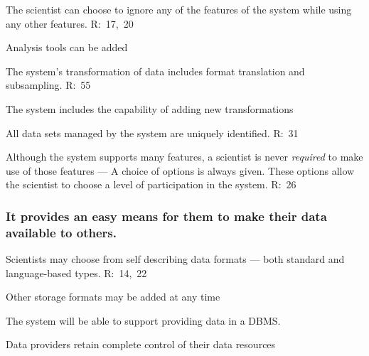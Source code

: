 \begin{list}{}{}
\begin{list}{.}{}
\item The scientist can choose to ignore any of the features of the system
       while using any other features.
       R:~17,~20

\item Analysis tools can be added

\begin{list}{--}{}

     \item The system's transformation of data includes format translation
           and subsampling. 
           R:~55

     \item The system includes the capability of adding new
           transformations

\end{list}

\item All data sets managed by the system are uniquely identified.
       R:~31

\item Although the system supports many features, a scientist is never
{\em required\/} to make use of those features --- A choice of options is
always given. These options allow the scientist to choose a level of
participation in the system.  R:~26
      
\end{list}

\subsubsection {It provides an easy means for them to make their data 
available to others.}

\begin{list}{.}{}

\item Scientists may choose from self describing data formats --- both
       standard and language-based types. 
       R:~14,~22

\item Other storage formats may be added at any time

\item The system will be able to support providing data in a DBMS.

\item Data providers retain complete control of their data resources

\end{list}


\end{list}
